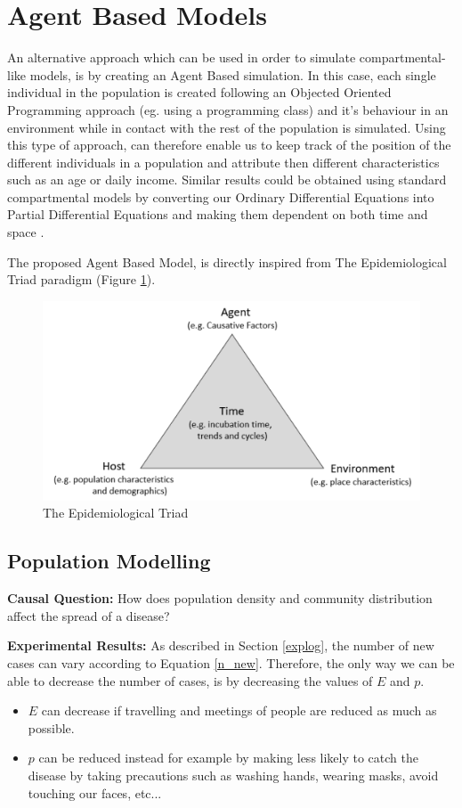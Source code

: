 \section{Agent Based Models}
An alternative approach which can be used in order to simulate compartmental-like models, is by creating an Agent Based simulation. In this case, each single individual in the population is created following an Objected Oriented Programming approach (eg. using a programming class) and it's behaviour in an environment while in contact with the rest of the population is simulated. Using this type of approach, can therefore enable us to keep track of the position of the different individuals in a population and attribute then different characteristics such as an age or daily income. Similar results could be obtained using standard compartmental models by converting our Ordinary Differential Equations into Partial Differential Equations and making them dependent on both time and space \cite{pde}.

The proposed Agent Based Model, is directly inspired from The Epidemiological Triad paradigm (Figure \ref{triad}).

\begin{figure}[h]
\vspace{-0.2cm}
\centering
\includegraphics[scale = 0.5]{latex/images/model.pdf}
\caption{The Epidemiological Triad}
\label{triad}
\end{figure}

\subsection{Population Modelling}

\textbf{Causal Question:} How does population density and community distribution affect the spread of a disease?

\textbf{Experimental Results:} As described in Section \ref{explog}, the number of new cases can vary according to Equation \ref{n_new}. Therefore, the only way we can be able to decrease the number of cases, is by decreasing the values of $E$ and $p$. 
\begin{itemize}
    \setlength\itemsep{-0.3cm}
    \item $E$ can decrease if travelling and meetings of people are reduced as much as possible.
    \item $p$ can be reduced instead for example by making less likely to catch the disease by taking precautions such as washing hands, wearing masks, avoid touching our faces, etc...
\end{itemize}

